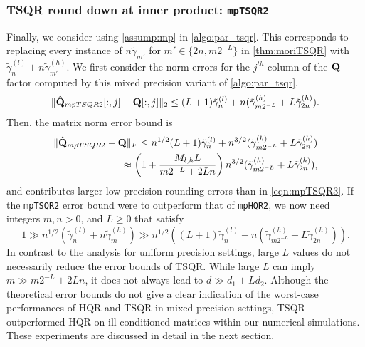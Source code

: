 \subsubsection{TSQR round down at inner product: {\tt mpTSQR2}}
Finally, we consider using \cref{assump:mp} in \cref{algo:par_tsqr}.
This corresponds to replacing every instance of $n\tilde{\gamma}_{m'}$ for $m'\in\{2n, m2^{-L}\}$ in \cref{thm:moriTSQR} with $\tilde{\gamma}_n^{(l)} + n\tilde{\gamma}_{m'}^{(h)}$.
We first consider the norm errors for the $j^{th}$ column of the $\mathbf{Q}$ factor computed by this mixed precision variant of \cref{algo:par_tsqr},
\begin{equation}
	\|\hat{\bb{Q}}_{mpTSQR2}[:,j] -\bb{Q}[:,j]\|_2 \leq (L+1)\tilde{\gamma}_n^{(l)} +n(\tilde{\gamma}_{m2^{-L}}^{(h)} + L\tilde{\gamma}_{ 2n}^{(h)}).\label{eqn:mptsqr2Qcol}
\end{equation} 
Then, the matrix norm error bound is 
\begin{align}
\|\hat{\bb{Q}}_{mpTSQR2}-\bb{Q}\|_F \leq n^{1/2}(L+1)\tilde{\gamma}_n^{(l)} +n^{3/2}(\tilde{\gamma}_{m2^{-L}}^{(h)} + L\tilde{\gamma}_{ 2n}^{(h)})\\
\approx \left(1+ \frac{M_{l,h}L}{m2^{-L}+ 2Ln}\right)n^{3/2}(\tilde{\gamma}_{m2^{-L}}^{(h)} + L\tilde{\gamma}_{ 2n}^{(h)}),\label{eqn:mptsqr2Q}
\end{align}
and contributes larger low precision rounding errors than in \cref{eqn:mpTSQR3}.
If the {\tt mpTSQR2} error bound were to outperform that of {\tt mpHQR2}, we now need integers $m, n > 0$, and $L\geq 0$ that satisfy
\begin{equation*}
1\gg n^{1/2}\left(\tilde{\gamma}_{n}^{(l)} + n\tilde{\gamma}_{m}^{(h)}\right) \gg n^{1/2}\left((L+1)\tilde{\gamma}_n^{(l)} +n(\tilde{\gamma}_{m2^{-L}}^{(h)} + L\tilde{\gamma}_{ 2n}^{(h)})\right).%
\end{equation*}
In contrast to the analysis for uniform precision settings, large $L$ values do not necessarily reduce the error bounds of TSQR. 
While large $L$ can imply $m\gg m2^{-L}+2Ln$, it does not always lead to $d \gg d_1+Ld_2$.
Although the theoretical error bounds do not give a clear indication of the worst-case performances of HQR and TSQR in mixed-precision settings, TSQR outperformed HQR on ill-conditioned matrices within our numerical simulations.
These experiments are discussed in detail in the next section.%
